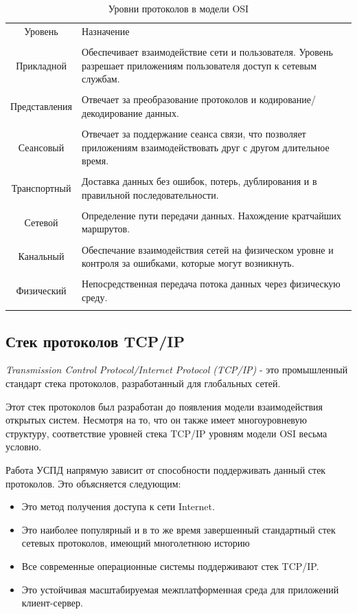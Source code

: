 \documentclass[utf8,14pt, coursreport]{G7-32}
\begin{document}
\begin{table}[h!]
\caption{Уровни протоколов в модели OSI}
\label{osi}
	\begin{tabular}{|c| >{\centering} m{120mm} <{\centering}|}
	\hline
	Уровень & Назначение \\
	\tabularnewline
	\hline
	Прикладной & Обеспечивает взаимодействие сети и пользователя. Уровень разрешает приложениям пользователя доступ к сетевым службам.\\
	\tabularnewline
	\hline
	Представления & Отвечает за преобразование протоколов и кодирование/декодирование данных.\\
	\tabularnewline
	\hline	
	Сеансовый & Отвечает за поддержание сеанса связи, что позволяет приложениям взаимодействовать друг с другом длительное время.\\
	\tabularnewline
	\hline
	Транспортный & Доставка данных без ошибок, потерь, дублирования и в правильной последовательности.\\
	\tabularnewline
	\hline
	Сетевой & Определение пути передачи данных. Нахождение кратчайших маршрутов.\\
	\tabularnewline
	\hline
	Канальный & Обеспечание взаимодействия сетей на физическом уровне и контроля за ошибками, которые могут возникнуть.\\
	\tabularnewline
	\hline
	Физический & Непосредственная передача потока данных через физическую среду.\\
	\tabularnewline
	\hline 
	\end{tabular}
\end{table}

\subsection{Стек протоколов TCP/IP}

\textit{Transmission Control Protocol/Internet Protocol (TCP/IP)} - это промышленный стандарт стека протоколов, разработанный для глобальных сетей\cite{tcpip}.

Этот стек протоколов был разработан до появления модели взаимодействия открытых систем. Несмотря на то, что он также имеет многоуровневую структуру, соответствие уровней стека TCP/IP уровням модели OSI весьма условно.

Работа УСПД напрямую зависит от способности поддерживать данный стек протоколов. Это объясняется следующим:
\begin{itemize}
\item Это метод получения доступа к сети Internet.
\item Это наиболее популярный и в то же время завершенный стандартный стек сетевых протоколов, имеющий многолетнюю историю
\item Все современные операционные системы поддерживают стек TCP/IP. 
\item Это устойчивая масштабируемая межплатформенная среда для приложений клиент-сервер.
\end{itemize}
\end{document}
